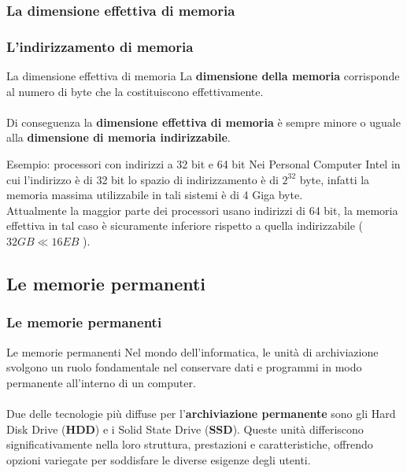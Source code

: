 \subsubsection[La dimensione effettiva di memoria]{La dimensione effettiva di memoria}
\begin{frame}
	\frametitle{L'indirizzamento di memoria}
	
	\begin{block}{La dimensione effettiva di memoria}
		La \textbf{dimensione della memoria} corrisponde al numero di byte che la costituiscono effettivamente.\\~\\
		Di conseguenza la \textbf{dimensione effettiva di memoria} è sempre minore o uguale alla \textbf{dimensione di memoria indirizzabile}.		
	\end{block}
	
	\begin{block}{Esempio: processori con indirizzi a 32 bit e 64 bit}
		Nei Personal Computer Intel in cui l'indirizzo è di 32 bit lo spazio di indirizzamento è di $2^{32}$ byte, infatti la memoria massima utilizzabile in tali sistemi è di 4 Giga byte.\\
		Attualmente la maggior parte dei processori usano indirizzi di 64 bit, la memoria effettiva in tal caso è sicuramente inferiore rispetto a quella indirizzabile ($32GB \ll 16EB$ ).
		
	\end{block}
\end{frame}





\subsection[Le memorie permanenti]{Le memorie permanenti}
\begin{frame}
	\frametitle{Le memorie permanenti}
	  
	\begin{block}{Le memorie permanenti}
		Nel mondo dell'informatica, le unità di archiviazione svolgono un ruolo fondamentale nel conservare dati e programmi in modo permanente all'interno di un computer.\\~\\
		Due delle tecnologie più diffuse per l'\textbf{archiviazione permanente} sono gli Hard Disk Drive (\textbf{HDD}) e i Solid State Drive (\textbf{SSD}). Queste unità differiscono significativamente nella loro struttura, prestazioni e caratteristiche, offrendo opzioni variegate per soddisfare le diverse esigenze degli utenti.
	\end{block}

\end{frame}

